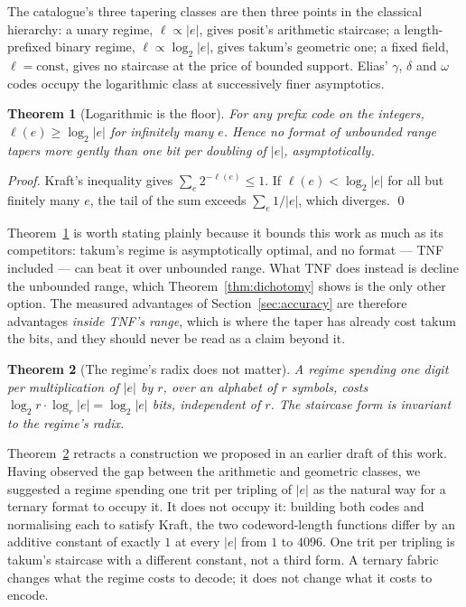 \documentclass[11pt]{article}
\newtheorem{theorem}{Theorem}
\theoremstyle{definition}
\begin{document}
The catalogue's three tapering classes are then three points in the classical
hierarchy: a unary regime, $\ell \propto |e|$, gives posit's arithmetic
staircase; a length-prefixed binary regime, $\ell \propto \log_2|e|$, gives
takum's geometric one; a fixed field, $\ell = \mathrm{const}$, gives no staircase
at the price of bounded support. Elias' $\gamma$, $\delta$ and $\omega$ codes
occupy the logarithmic class at successively finer asymptotics.

\begin{theorem}[Logarithmic is the floor]
\label{thm:floor}
For any prefix code on the integers, $\ell(e) \geq \log_2|e|$ for infinitely many
$e$. Hence no format of unbounded range tapers more gently than one bit per
doubling of $|e|$, asymptotically.
\end{theorem}

\begin{proof}
Kraft's inequality gives $\sum_e 2^{-\ell(e)} \leq 1$. If $\ell(e) < \log_2|e|$
for all but finitely many $e$, the tail of the sum exceeds
$\sum_e 1/|e|$, which diverges. \qed
\end{proof}

Theorem~\ref{thm:floor} is worth stating plainly because it bounds this work as
much as its competitors: takum's regime is asymptotically optimal, and no format
--- TNF included --- can beat it over unbounded range. What TNF does instead is
decline the unbounded range, which Theorem~\ref{thm:dichotomy} shows is the only
other option. The measured advantages of Section~\ref{sec:accuracy} are therefore
advantages \emph{inside TNF's range}, which is where the taper has already cost
takum the bits, and they should never be read as a claim beyond it.

\begin{theorem}[The regime's radix does not matter]
\label{thm:radixinv}
A regime spending one digit per multiplication of $|e|$ by $r$, over an alphabet
of $r$ symbols, costs $\log_2 r \cdot \log_r |e| = \log_2 |e|$ bits, independent
of $r$. The staircase form is invariant to the regime's radix.
\end{theorem}

Theorem~\ref{thm:radixinv} retracts a construction we proposed in an earlier draft
of this work. Having observed the gap between the arithmetic and geometric
classes, we suggested a regime spending one trit per tripling of $|e|$ as the
natural way for a ternary format to occupy it. It does not occupy it: building
both codes and normalising each to satisfy Kraft, the two codeword-length
functions differ by an additive constant of exactly $1$ at every $|e|$ from $1$ to
$4096$. One trit per tripling is takum's staircase with a different constant, not
a third form. A ternary fabric changes what the regime costs to decode; it does
not change what it costs to encode.
\end{document}
